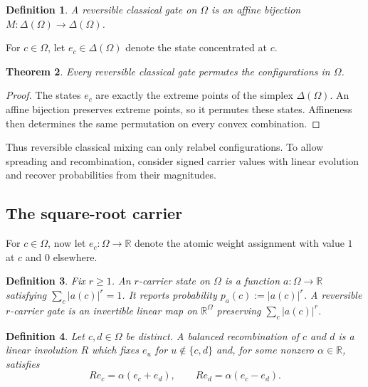 \documentclass[11pt]{article}
\numberwithin{equation}{section}
\newtheorem{definition}{Definition}[section]
\newtheorem{theorem}[definition]{Theorem}
\theoremstyle{remark}
\begin{document}
\begin{definition}
\label{def:reversible-classical-gate}
A \emph{reversible classical gate} on $\Omega$ is an affine bijection
$M:\Delta(\Omega)\to\Delta(\Omega)$.
\end{definition}

For $c\in\Omega$, let $e_c\in\Delta(\Omega)$ denote the state concentrated
at $c$.

\begin{theorem}
\label{thm:permutation-wall}
Every reversible classical gate permutes the configurations in $\Omega$.
\end{theorem}

\begin{proof}
The states $e_c$ are exactly the extreme points of the simplex
$\Delta(\Omega)$. An affine bijection preserves extreme points, so it
permutes these states. Affineness then determines the same permutation on
every convex combination.
\end{proof}

Thus reversible classical mixing can only relabel configurations. To allow
spreading and recombination, consider signed carrier values with linear
evolution and recover probabilities from their magnitudes.

\subsection{The square-root carrier}

For $c\in\Omega$, now let $e_c:\Omega\to\mathbb R$ denote the atomic weight
assignment with value $1$ at $c$ and $0$ elsewhere.

\begin{definition}
\label{def:power-law-carrier}
Fix $r\geq1$. An \emph{$r$-carrier state} on $\Omega$ is a function
$a:\Omega\to\mathbb R$ satisfying
$\sum_c|a(c)|^r=1$. It reports probability $p_a(c):=|a(c)|^r$.
A \emph{reversible $r$-carrier gate} is an invertible linear map on
$\mathbb R^\Omega$ preserving $\sum_c|a(c)|^r$.
\end{definition}

\begin{definition}
\label{def:balanced-recombination}
Let $c,d\in\Omega$ be distinct. A \emph{balanced recombination} of $c$ and
$d$ is a linear involution $R$ which fixes $e_u$ for
$u\notin\{c,d\}$ and, for some nonzero $\alpha\in\mathbb R$, satisfies
\begin{equation}
    Re_c=\alpha(e_c+e_d),
    \qquad
    Re_d=\alpha(e_c-e_d).
\end{equation}
\end{definition}
\end{document}
